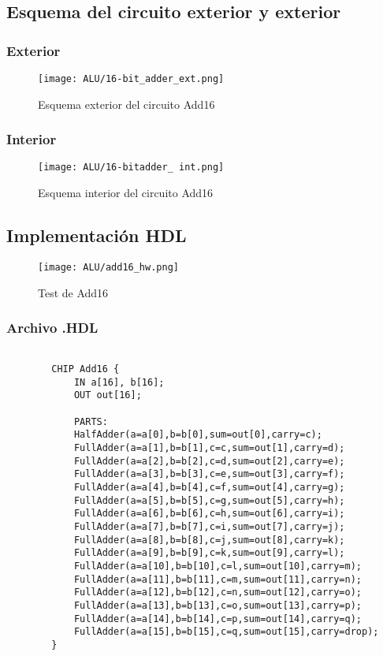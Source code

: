 \documentclass[12pt]{article}
\begin{document}
	\subsection{Esquema del circuito exterior y exterior}
	\subsubsection{Exterior}
	\begin{figure}[H]
		\centering
		\texttt{[image: ALU/16-bit\_adder\_ext.png]}
		\caption{Esquema exterior del circuito Add16}
		\label{fig:add16}
	\end{figure}
	\subsubsection{Interior}
	\begin{figure}[H]
		\centering
		\texttt{[image: ALU/16-bitadder\_ int.png]}
		\caption{Esquema interior del circuito Add16}
		\label{fig:f_add16}
	\end{figure}
	\subsection{Implementación HDL}
	\begin{figure}[H]
		\centering
		\texttt{[image: ALU/add16\_hw.png]}
		\caption{Test de Add16}
		\label{fig:enter-label}
	\end{figure}
	\newpage
	\subsubsection{Archivo .HDL}
	\begin{lstlisting}

		CHIP Add16 {
			IN a[16], b[16];
			OUT out[16];

			PARTS:
			HalfAdder(a=a[0],b=b[0],sum=out[0],carry=c);
			FullAdder(a=a[1],b=b[1],c=c,sum=out[1],carry=d);
			FullAdder(a=a[2],b=b[2],c=d,sum=out[2],carry=e);
			FullAdder(a=a[3],b=b[3],c=e,sum=out[3],carry=f);
			FullAdder(a=a[4],b=b[4],c=f,sum=out[4],carry=g);
			FullAdder(a=a[5],b=b[5],c=g,sum=out[5],carry=h);
			FullAdder(a=a[6],b=b[6],c=h,sum=out[6],carry=i);
			FullAdder(a=a[7],b=b[7],c=i,sum=out[7],carry=j);
			FullAdder(a=a[8],b=b[8],c=j,sum=out[8],carry=k);
			FullAdder(a=a[9],b=b[9],c=k,sum=out[9],carry=l);
			FullAdder(a=a[10],b=b[10],c=l,sum=out[10],carry=m);
			FullAdder(a=a[11],b=b[11],c=m,sum=out[11],carry=n);
			FullAdder(a=a[12],b=b[12],c=n,sum=out[12],carry=o);
			FullAdder(a=a[13],b=b[13],c=o,sum=out[13],carry=p);
			FullAdder(a=a[14],b=b[14],c=p,sum=out[14],carry=q);
			FullAdder(a=a[15],b=b[15],c=q,sum=out[15],carry=drop);
		}
	\end{lstlisting}
\end{document}
